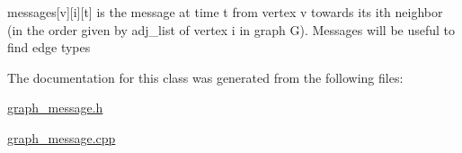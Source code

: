 messages\mbox{[}v\mbox{]}\mbox{[}i\mbox{]}\mbox{[}t\mbox{]} is the message at time t from vertex v towards its ith neighbor (in the order given by adj\+\_\+list of vertex i in graph G). Messages will be useful to find edge types 



The documentation for this class was generated from the following files\+:\begin{DoxyCompactItemize}
\item 
\hyperlink{graph__message_8h}{graph\+\_\+message.\+h}\item 
\hyperlink{graph__message_8cpp}{graph\+\_\+message.\+cpp}\end{DoxyCompactItemize}
